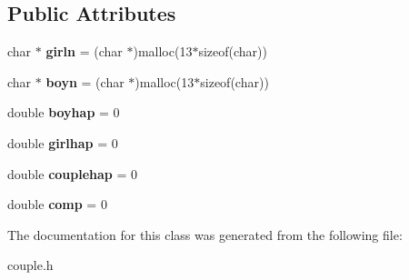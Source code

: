 \subsection*{Public Attributes}
\begin{DoxyCompactItemize}
\item 
char $\ast$ {\bfseries girln} = (char $\ast$)malloc(13$\ast$sizeof(char))\hypertarget{classcouple_a73bcca28fbfedadaed984df4db93eb76}{}\label{classcouple_a73bcca28fbfedadaed984df4db93eb76}

\item 
char $\ast$ {\bfseries boyn} = (char $\ast$)malloc(13$\ast$sizeof(char))\hypertarget{classcouple_a51a8ccd5a7163c8085fbcad2284e22a2}{}\label{classcouple_a51a8ccd5a7163c8085fbcad2284e22a2}

\item 
double {\bfseries boyhap} = 0\hypertarget{classcouple_a04146495d324fd4ea9eac899d10beeed}{}\label{classcouple_a04146495d324fd4ea9eac899d10beeed}

\item 
double {\bfseries girlhap} = 0\hypertarget{classcouple_a77e57dc79a0c5e03a681630ca18e00eb}{}\label{classcouple_a77e57dc79a0c5e03a681630ca18e00eb}

\item 
double {\bfseries couplehap} = 0\hypertarget{classcouple_ad7deffe07e4a05a748271d23815e3a94}{}\label{classcouple_ad7deffe07e4a05a748271d23815e3a94}

\item 
double {\bfseries comp} = 0\hypertarget{classcouple_a8dd5cc0dc3ef8e1f415add29840ab6e0}{}\label{classcouple_a8dd5cc0dc3ef8e1f415add29840ab6e0}

\end{DoxyCompactItemize}


The documentation for this class was generated from the following file\+:\begin{DoxyCompactItemize}
\item 
couple.\+h\end{DoxyCompactItemize}
